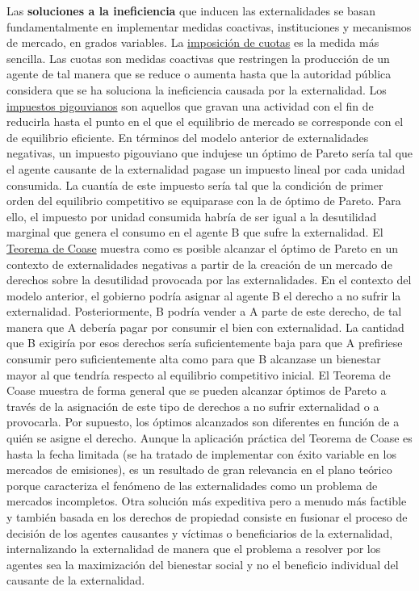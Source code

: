 \documentclass{nuevotema}
\begin{document}
Las \textbf{soluciones a la ineficiencia} que inducen las externalidades se basan fundamentalmente en implementar medidas coactivas, instituciones y mecanismos de mercado, en grados variables. La \underline{imposición de cuotas} es la medida más sencilla. Las cuotas son medidas coactivas que restringen la producción de un agente de tal manera que se reduce o aumenta hasta que la autoridad pública considera que se ha soluciona la ineficiencia causada por la externalidad. Los \underline{impuestos pigouvianos} son aquellos que gravan una actividad con el fin de reducirla hasta el punto en el que el equilibrio de mercado se corresponde con el de equilibrio eficiente. En términos del modelo anterior de externalidades negativas, un impuesto pigouviano que indujese un óptimo de Pareto sería tal que el agente causante de la externalidad pagase un impuesto lineal por cada unidad consumida. La cuantía de este impuesto sería tal que la condición de primer orden del equilibrio competitivo se equiparase con la de óptimo de Pareto. Para ello, el impuesto por unidad consumida habría de ser igual a la desutilidad marginal que genera el consumo en el agente B que sufre la externalidad. El \underline{Teorema de Coase} muestra como es posible alcanzar el óptimo de Pareto en un contexto de externalidades negativas a partir de la creación de un mercado de derechos sobre la desutilidad provocada por las externalidades. En el contexto del modelo anterior, el gobierno podría asignar al agente B el derecho a no sufrir la externalidad. Posteriormente, B podría vender a A parte de este derecho, de tal manera que A debería pagar por consumir el bien con externalidad. La cantidad que B exigiría por esos derechos sería suficientemente baja para que A prefiriese consumir pero suficientemente alta como para que B alcanzase un bienestar mayor al que tendría respecto al equilibrio competitivo inicial. El Teorema de Coase muestra de forma general que se pueden alcanzar óptimos de Pareto a través de la asignación de este tipo de derechos a no sufrir externalidad o a provocarla. Por supuesto, los óptimos alcanzados son diferentes en función de a quién se asigne el derecho. Aunque la aplicación práctica del Teorema de Coase es hasta la fecha limitada (se ha tratado de implementar con éxito variable en los mercados de emisiones), es un resultado de gran relevancia en el plano teórico porque caracteriza el fenómeno de las externalidades como un problema de mercados incompletos. Otra solución más expeditiva pero a menudo más factible y también basada en los derechos de propiedad consiste en fusionar el proceso de decisión de los agentes causantes y víctimas o beneficiarios de la externalidad, internalizando la externalidad de manera que el problema a resolver por los agentes sea la maximización del bienestar social y no el beneficio individual del causante de la externalidad.
\end{document}
